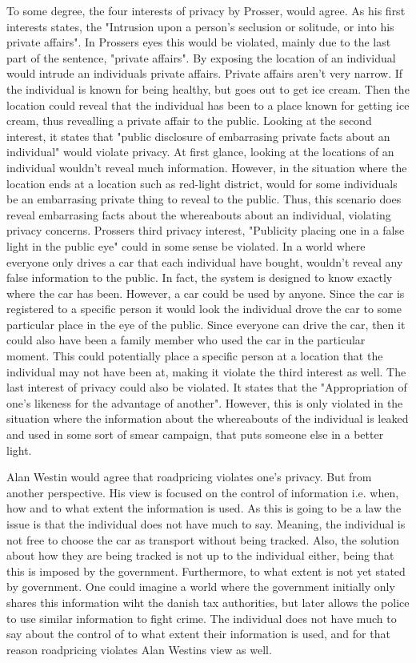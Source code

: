 To some degree, the four interests of privacy by Prosser, would agree. 
As his first interests states, the "Intrusion upon a person's seclusion or solitude, or into his private affairs". In Prossers eyes this would be violated, mainly due to the last part of the sentence, "private affairs". By exposing the location of an individual would intrude an individuals private affairs. Private affairs aren't very narrow. If the individual is known for being healthy, but goes out to get ice cream. Then the location could reveal that the individual has been to a place known for getting ice cream, thus revealling a private affair to the public.  
Looking at the second interest, it states that "public disclosure of embarrasing private facts about an individual" would violate privacy. At first glance, looking at the locations of an individual wouldn't reveal much information. However, in the situation where the location ends at a location such as red-light district, would for some individuals be an embarrasing private thing to reveal to the public. Thus, this scenario does reveal embarrasing facts about the whereabouts about an individual, violating privacy concerns. Prossers third privacy interest, "Publicity placing one in a false light in the public eye" could in some sense be violated. In a world where everyone only drives a car that each individual have bought, wouldn't reveal any false information to the public. In fact, the system is designed to know exactly where the car has been. However, a car could be used by anyone. Since the car is registered to a specific person it would look the individual drove the car to some particular place in the eye of the public. Since everyone can drive the car, then it could also have been a family member who used the car in the particular moment. This could potentially place a specific person at a location that the individual may not have been at, making it violate the third interest as well. 
The last interest of privacy could also be violated. It states that the "Appropriation of one's likeness for the advantage of another". However, this is only violated in the situation where the information about the whereabouts of the individual is leaked and used in some sort of smear campaign, that puts someone else in a better light.  

Alan Westin would agree that roadpricing violates one's privacy. But from another perspective. His view is focused on the control of information i.e. when, how and to what extent the information is used. As this is going to be a law the issue is that the individual does not have much to say. Meaning, the individual is not free to choose the car as transport without being tracked. Also, the solution about how they are being tracked is not up to the individual either, being that this is imposed by the government. Furthermore, to what extent is not yet stated by government. One could imagine a world where the government initially only shares this information wiht the danish tax authorities, but later allows the police to use similar information to fight crime. The individual does not have much to say about the control of to what extent their information is used, and for that reason roadpricing violates Alan Westins view as well.  

